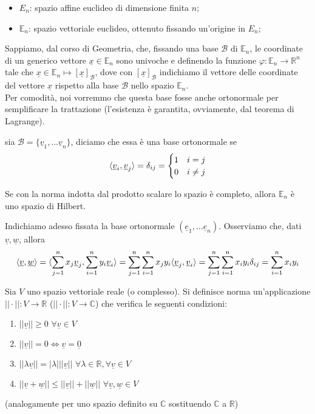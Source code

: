\documentclass[openany]{book}
\begin{document}
	\begin{itemize}
		\item $E_n$: spazio affine euclideo di dimensione finita $n$;
		\item $\mathbb{E}_n$: spazio vettoriale euclideo, ottenuto fissando un'origine in $E_n$;
	\end{itemize}
	Sappiamo, dal corso di Geometria, che, fissando una base $\mathcal{B}$ di $\mathbb{E}_n$, le coordinate di un generico vettore $\underline{x} \in \mathbb{E}_n$ sono univoche e definendo la funzione $\varphi: \mathbb{E}_n \to \mathbb{R}^n$ tale che $\underline{x} \in \mathbb{E}_n \mapsto [\underline{x}]_{\mathcal{B}}$, dove con $[\underline{x}]_{\mathcal{B}}$ indichiamo il vettore delle coordinate del vettore $\underline{x}$ rispetto alla base $\mathcal{B}$ nello spazio $\mathbb{E}_n$. \\
Per comodità, noi vorremmo che questa base fosse anche ortonormale per semplificare la trattazione (l'esistenza è garantita, ovviamente, dal teorema di Lagrange). 
\begin{definition}
	sia $\mathcal{B} = \{ \underline{v}_1, \ldots \underline{v}_n \}$, diciamo che essa è una base ortonormale se
	$$
	\langle \underline{v}_i, \underline{v}_j \rangle = \delta_{ij} = \begin{cases} 1 & i = j \\ 0 & i \neq j \end{cases}	
	$$
\end{definition}
\begin{remark}
	Se con la norma indotta dal prodotto scalare lo spazio è completo, allora $\mathbb{E}_n$ è uno spazio di Hilbert.
\end{remark}
\noindent Indichiamo adesso fissata la base ortonormale $(\underline{e}_1, \ldots \underline{e}_n)$. Osserviamo che, dati $\underline{v}, \underline{w}$, allora
$$
\langle \underline{v}, \underline{w} \rangle = \langle \sum_{j=1}^n x_j \underline{v}_j, \sum_{i=1}^n y_i \underline{v}_i \rangle = \sum_{j=1}^n \sum_{i=1}^n x_j y_i \langle \underline{v}_j, \underline{v}_i \rangle = \sum_{j=1}^n \sum_{i=1}^n x_i y_i \delta_{ij} = \sum_{i=1}^n x_i y_i
$$
\begin{definition}[norma]
	Sia $V$ uno spazio vettoriale reale (o complesso). Si definisce norma un'applicazione $|| \cdot ||: V \to \mathbb{R}$ ($|| \cdot ||: V \to \mathbb{C}$) che verifica le seguenti condizioni:
	\begin{enumerate}[label=\protect\circled{\arabic*}]
		\item $||\underline{v}|| \geq 0 \, \, \forall \underline{v} \in V$
		\item $|| \underline{v} || = 0 \iff \underline{v} = \underline{0}$
		\item $|| \lambda \underline{v} || = | \lambda | || \underline{v} || \, \, \forall \lambda \in \mathbb{R}, \forall \underline{v} \in V$
		\item $|| \underline{v} + \underline{w} || \leq || \underline{v} || + || \underline{w} || \, \, \forall \underline{v}, \underline{w} \in V$
	\end{enumerate}
	(analogamente per uno spazio definito su $\mathbb{C}$ sostituendo $\mathbb{C}$ a $\mathbb{R}$)
\end{definition}
\end{document}
